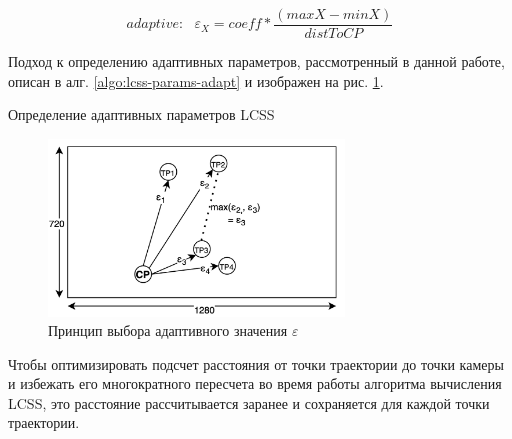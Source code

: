 
\begin{equation} \label{eq:st_adapt}
	adaptive: \ \ \ \varepsilon_{X} = coeff * \frac{(maxX - minX)}{distToCP}
\end{equation}

Подход к определению адаптивных параметров, рассмотренный в данной работе, описан в алг. \ref{algo:lcss-params-adapt} и изображен на рис. \ref{fig:adaptivity}.

\begin{algorithm}[!htb]
	\caption{Определение адаптивных параметров LCSS}
	\label{algo:lcss-params-adapt}
	\SetAlgoLined
\end{algorithm}

\begin{figure}[!htb]
	\centering{}
	\includegraphics[width=0.7\textwidth]{images/adaptivity.png}
	\caption{Принцип выбора адаптивного значения $\varepsilon$}
	\label{fig:adaptivity}
\end{figure}

Чтобы оптимизировать подсчет расстояния от точки траектории до точки камеры и избежать его многократного пересчета во время работы алгоритма вычисления LCSS, это расстояние рассчитывается заранее и сохраняется для каждой точки траектории.

